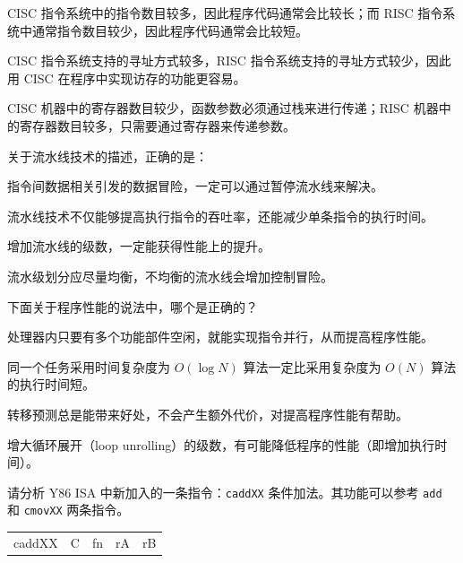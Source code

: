 \begin{problems}
\begin{choices}
            \item CISC 指令系统中的指令数目较多，因此程序代码通常会比较长；而 RISC 指令系统中通常指令数目较少，因此程序代码通常会比较短。
            \item CISC 指令系统支持的寻址方式较多，RISC 指令系统支持的寻址方式较少，因此用 CISC 在程序中实现访存的功能更容易。
            \item CISC 机器中的寄存器数目较少，函数参数必须通过栈来进行传递；RISC 机器中的寄存器数目较多，只需要通过寄存器来传递参数。
        \end{choices}
         关于流水线技术的描述，正确的是：
        \begin{choices}
            \item 指令间数据相关引发的数据冒险，一定可以通过暂停流水线来解决。
            \item 流水线技术不仅能够提高执行指令的吞吐率，还能减少单条指令的执行时间。
            \item 增加流水线的级数，一定能获得性能上的提升。
            \item 流水级划分应尽量均衡，不均衡的流水线会增加控制冒险。
        \end{choices}
         下面关于程序性能的说法中，哪个是正确的？
        \begin{choices}
            \item 处理器内只要有多个功能部件空闲，就能实现指令并行，从而提高程序性能。
            \item 同一个任务采用时间复杂度为 $O(\log N)$ 算法一定比采用复杂度为 $O(N)$ 算法的执行时间短。
            \item 转移预测总是能带来好处，不会产生额外代价，对提高程序性能有帮助。
            \item 增大循环展开（loop unrolling）的级数，有可能降低程序的性能（即增加执行时间）。
        \end{choices}
         请分析 Y86 ISA 中新加入的一条指令：\verb|caddXX| 条件加法。其功能可以参考 \verb|add| 和 \verb|cmovXX| 两条指令。
        \begin{table}[H]
            \centering
            \begin{tabular}{c|c|c|c|c|}
                \cline{2-5}
                caddXX & C & fn & rA & rB \\ \cline{2-5} 
            \end{tabular}
        \end{table}


\end{problems}
